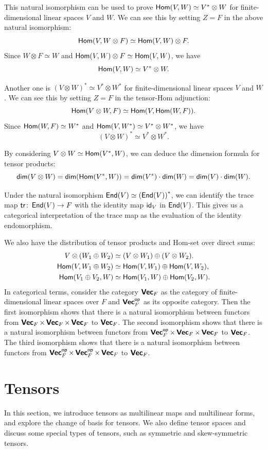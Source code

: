 This natural isomorphism can be used to prove $\Hom(V, W) \simeq V^* \otimes W$ for finite-dimensional linear spaces $V$ and $W$. We can see this by setting $Z = F$ in the above natural isomorphism:
\[
	\Hom(V, W \otimes F) \simeq \Hom(V, W) \otimes F.
\]
Since $W \otimes F \simeq W$ and $\Hom(V, W) \otimes F \simeq \Hom(V, W)$, we have
\[
	\Hom(V, W) \simeq V^* \otimes W.
\]

Another one is ${(V \otimes W)}^* \simeq V^* \otimes W^*$ for finite-dimensional linear spaces $V$ and $W$. We can see this by setting $Z = F$ in the tensor-Hom adjunction:
\[
	\Hom(V \otimes W, F) \simeq \Hom(V, \Hom(W, F)).
\]
Since $\Hom(W, F) \simeq W^*$ and $\Hom(V, W^*) \simeq V^* \otimes W^*$, we have
\[
	{(V \otimes W)}^* \simeq V^* \otimes W^*.
\]

By considering $V \otimes W \simeq \Hom(V^*, W)$, we can deduce the dimension formula for tensor products:
\[
	\dim(V \otimes W) = \dim(\Hom(V^*, W)) = \dim(V^*) \cdot \dim(W) = \dim(V) \cdot \dim(W).
\]

Under the natural isomorphism $\End(V) \simeq {(\End(V))}^*$, we can identify the trace map $\tr \colon \End(V) \to F$ with the identity map $\id_V$ in $\End(V)$. This gives us a categorical interpretation of the trace map as the evaluation of the identity endomorphism.

We also have the distribution of tensor products and Hom-set over direct sums:
\begin{align*}
	V \otimes (W_1 \oplus W_2) & \simeq (V \otimes W_1) \oplus (V \otimes W_2). \\
	\Hom(V, W_1 \oplus W_2)    & \simeq \Hom(V, W_1) \oplus \Hom(V, W_2),       \\
	\Hom(V_1 \oplus V_2, W)    & \simeq \Hom(V_1, W) \oplus \Hom(V_2, W).
\end{align*}
In categorical terms, consider the category $\Vect_F$ as the category of finite-dimensional linear spaces over $F$ and $\Vect_F^{\op}$ as its opposite category. Then the first isomorphism shows that there is a natural isomorphism between functors from $\Vect_F \times \Vect_F \times \Vect_F$ to $\Vect_F$. The second isomorphism shows that there is a natural isomorphism between functors from $\Vect_F^{\op} \times \Vect_F \times \Vect_F$ to $\Vect_F$. The third isomorphism shows that there is a natural isomorphism between functors from $\Vect_F^{\op} \times \Vect_F^{\op} \times \Vect_F$ to $\Vect_F$.

\section{Tensors}
In this section, we introduce tensors as multilinear maps and multilinear forms, and explore the change of basis for tensors. We also define tensor spaces and discuss some special types of tensors, such as symmetric and skew-symmetric tensors.

